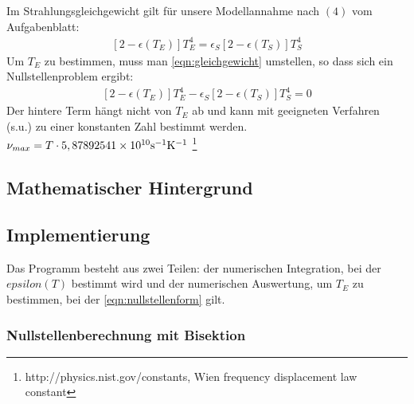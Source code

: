 \documentclass[10pt,a4paper]{article}
\begin{document}
Im Strahlungsgleichgewicht gilt für unsere Modellannahme nach $(4)$ vom Aufgabenblatt:
\begin{align}
\left[2-\epsilon(T_E)\right]T_E^4=\epsilon_S\left[2-\epsilon(T_S)\right]T_S^4
\label{eqn:gleichgewicht}
\end{align}
Um $T_E$ zu bestimmen, muss man \ref{eqn:gleichgewicht} umstellen, so dass sich ein Nullstellenproblem ergibt:
\begin{align}
\left[2-\epsilon(T_E)\right]T_E^4-\epsilon_S\left[2-\epsilon(T_S)\right]T_S^4=0
\label{eqn:nullstellenform}
\end{align}
Der hintere Term hängt nicht von $T_E$ ab und kann mit geeigneten Verfahren (s.u.) zu einer konstanten Zahl bestimmt werden.
$\nu_{max}=T\cdot 5,8789254\num{1E10}\si{\per\second}\si{\per\kelvin}$ \footnote{http://physics.nist.gov/constants, Wien frequency displacement law constant}

\subsection{Mathematischer Hintergrund}

\subsection{Implementierung}

Das Programm besteht aus zwei Teilen: der numerischen Integration, bei der $epsilon(T)$ bestimmt wird und der numerischen Auswertung, um $T_E$ zu bestimmen, bei der \ref{eqn:nullstellenform} gilt.

\subsubsection{Nullstellenberechnung mit Bisektion}
\end{document}
